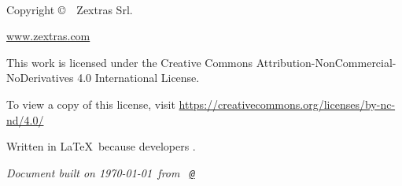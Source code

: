 
\newpage
~\vfill
\thispagestyle{empty}

Copyright \copyright\ \the\year\ Zextras Srl. %

\url{www.zextras.com} %

\ccbyncsa{}

This work is licensed under the Creative Commons Attribution-NonCommercial-NoDerivatives 4.0 International License.

To view a copy of this license, visit \url{https://creativecommons.org/licenses/by-nc-nd/4.0/}

\newcommand*{\writtenInLatex}{Written in \LaTeX\ because developers \ExcuseToUseLatex.}
\writtenInLatex

\textit{Document built on \today\ from \texttt{\branchName\ \href{https://github.com/ZeXtras/ZimbraDrive/tree/\commitId}{@\shortCommitId}}} %
